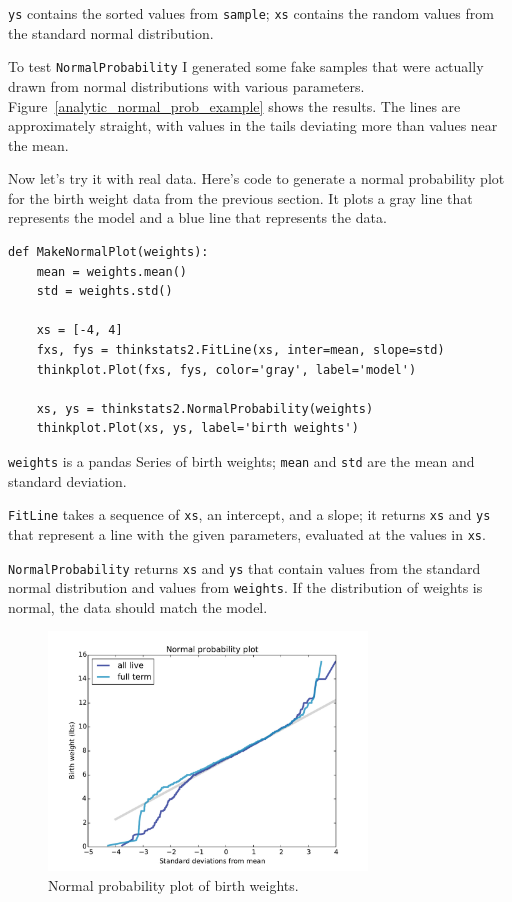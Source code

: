 \documentclass[12pt]{book}
\begin{document}
{\tt ys} contains the sorted values from {\tt sample}; {\tt xs}
contains the random values from the standard normal distribution.

To test {\tt NormalProbability} I generated some fake samples that
were actually drawn from normal distributions with various parameters.
Figure~\ref{analytic_normal_prob_example} shows the results.
The lines are approximately straight, with values in the tails
deviating more than values near the mean.

Now let's try it with real data.  Here's code to generate
a normal probability plot for the birth weight data from the
previous section.  It plots a gray line that represents the model
and a blue line that represents the data.

\begin{verbatim}
def MakeNormalPlot(weights):
    mean = weights.mean()
    std = weights.std()

    xs = [-4, 4]
    fxs, fys = thinkstats2.FitLine(xs, inter=mean, slope=std)
    thinkplot.Plot(fxs, fys, color='gray', label='model')

    xs, ys = thinkstats2.NormalProbability(weights)
    thinkplot.Plot(xs, ys, label='birth weights')
\end{verbatim}

{\tt weights} is a pandas Series of birth weights;
{\tt mean} and {\tt std} are the mean and standard deviation.

{\tt FitLine} takes a sequence of {\tt xs}, an intercept, and a
slope; it returns {\tt xs} and {\tt ys} that represent a line
with the given parameters, evaluated at the values in {\tt xs}.

{\tt NormalProbability} returns {\tt xs} and {\tt ys} that
contain values from the standard normal distribution and values
from {\tt weights}.  If the distribution of weights is normal,
the data should match the model.

\begin{figure}
\centerline{\includegraphics[height=2.5in]{figs/analytic_birthwgt_normal.pdf}}
\caption{Normal probability plot of birth weights.}
\label{analytic_birthwgt_normal}
\end{figure}
\end{document}

